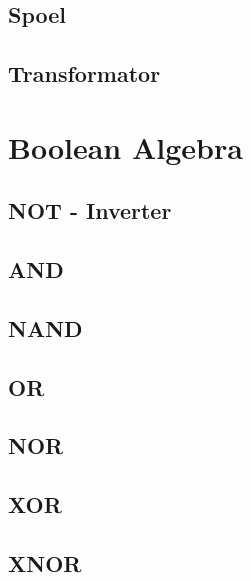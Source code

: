 \documentclass[a4paper,12pt,twoside,openright,titlepage]{book}
\begin{document}
\section{Spoel}

\section{Transformator}


\chapter{Boolean Algebra}

\section{NOT - Inverter}

\section{AND}

\section{NAND}

\section{OR}

\section{NOR}

\section{XOR}

\section{XNOR}


\backmatter
\printindex
\end{document}
